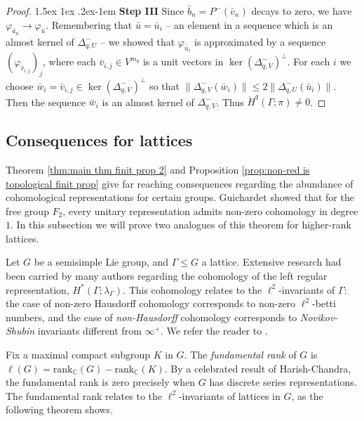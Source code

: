 \documentclass[12pt,reqno]{amsart}
\makeatletter
\theoremstyle{definition}
\newcommand{\torH}{\mathring{H}}
\renewcommand\paragraph{\@startsection{paragraph}{4}{\z@}%
  {1.5ex \@plus 1ex \@minus .2ex}{-1em}%
  {\normalfont\normalsize\bfseries}}
\makeatother
\begin{document}
\begin{proof}
    \paragraph{\textbf{Step III}} Since $\bar{b}_n=P^-(\bar{v}_n)$ decays to zero, we have $\varphi_{\bar{a}_n} \rightarrow \varphi_{\bar{u}}$. Remembering that $\bar{u}=\bar{u}_i$ -- an element in a sequence which is an almost kernel of $\Delta_{q,U}^-$ -- we showed that $\varphi_{\bar{u}_i}$ is approximated by a sequence $(\varphi_{\bar{v}_{i,j}})_j$, where each $\bar{v}_{i,j} \in V^{m_q}$ is a unit vectors in $\ker(\Delta_{q,V}^-)^\perp$. For each $i$ we choose $\bar{w}_i=\bar{v}_{i,j} \in\ker(\Delta_{q,V}^-)^\perp $ so that $\|\Delta_{q,V}^-(\bar{w}_{i}) \| \leq 2\|\Delta_{q,U}^-(\bar{u}_i) \|$. Then the sequence $\bar{w}_i$ is an almost kernel of $\Delta_{q,V}^-$. Thus $\torH^q(\Gamma;\pi) \ne 0$. 
\end{proof}

\subsection{Consequences for lattices}\label{subsec:3.2}
Theorem \ref{thm:main thm finit prop 2} and Proposition \ref{prop:non-red is topological finit prop} give far reaching consequences regarding the abundance of cohomological representations for certain groups. Guichardet \cite[Example~1]{Guichardet72} showed that for the free group $F_2$, every unitary representation admits non-zero cohomology in degree $1$. In this subsection we will prove two analogues of this theorem for higher-rank lattices. 

Let $G$ be a semisimple Lie group, and $\Gamma \leq G$ a lattice. Extensive research had been carried by many authors regarding the cohomology of the left regular representation, $H^*(\Gamma;\lambda_{\Gamma})$. This cohomology relates to the $\ell^2$-invariants of $\Gamma$: the case of non-zero Hausdorff cohomology corresponds to non-zero $\ell^2$-betti numbers, and the case of \emph{non-Hausdorff} cohomology corresponds to \emph{Novikov-Shubin} invariants different from $\infty^+$. We refer the reader to \cite{LuckBook}.

Fix a maximal compact subgroup $K$ in $G$. The \emph{fundamental rank} of $G$ is $\ell(G)=\mathrm{rank}_\mathbb{C}(G)-\mathrm{rank}_\mathbb{C}(K)$. By a celebrated result of Harish-Chandra, the fundamental rank is zero precisely when $G$ has discrete series representations. The fundamental rank relates to the $\ell^2$-invariants of lattices in $G$, as the following theorem shows.
\end{document}
